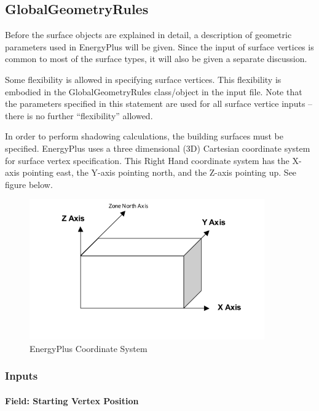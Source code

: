 \subsection{GlobalGeometryRules}\label{globalgeometryrules}

Before the surface objects are explained in detail, a description of geometric parameters used in EnergyPlus will be given. Since the input of surface vertices is common to most of the surface types, it will also be given a separate discussion.

Some flexibility is allowed in specifying surface vertices. This flexibility is embodied in the GlobalGeometryRules class/object in the input file. Note that the parameters specified in this statement are used for all surface vertice inputs -- there is no further ``flexibility'' allowed.

In order to perform shadowing calculations, the building surfaces must be specified. EnergyPlus uses a three dimensional (3D) Cartesian coordinate system for surface vertex specification. This Right Hand coordinate system has the X-axis pointing east, the Y-axis pointing north, and the Z-axis pointing up. See figure below.

\begin{figure}[hbtp] %
\centering
\includegraphics[width=0.9\textwidth, height=0.9\textheight, keepaspectratio=true]{media/image054.png}
\caption{EnergyPlus Coordinate System \protect \label{fig:energyplus-coordinate-system}}
\end{figure}

\subsubsection{Inputs}\label{inputs-3-038}

\paragraph{Field: Starting Vertex Position}\label{field-starting-vertex-position}

